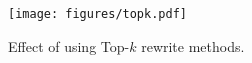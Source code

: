 \begin{figure}
    \centering
    \texttt{[image: figures/topk.pdf]}
    \caption{Effect of using Top-$k$ rewrite methods.}
    \label{fig:topk_rerank}
\end{figure}